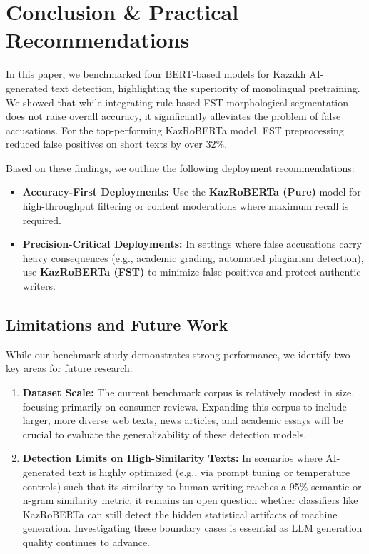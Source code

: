 \documentclass[runningheads]{llncs}
\begin{document}
\section{Conclusion \& Practical Recommendations}
In this paper, we benchmarked four BERT-based models for Kazakh AI-generated text detection, highlighting the superiority of monolingual pretraining. We showed that while integrating rule-based FST morphological segmentation does not raise overall accuracy, it significantly alleviates the problem of false accusations. For the top-performing KazRoBERTa model, FST preprocessing reduced false positives on short texts by over 32\%.

Based on these findings, we outline the following deployment recommendations:
\begin{itemize}
\item \textbf{Accuracy-First Deployments:} Use the \textbf{KazRoBERTa (Pure)} model for high-throughput filtering or content moderations where maximum recall is required.
\item \textbf{Precision-Critical Deployments:} In settings where false accusations carry heavy consequences (e.g., academic grading, automated plagiarism detection), use \textbf{KazRoBERTa (FST)} to minimize false positives and protect authentic writers.
\end{itemize}

\subsection{Limitations and Future Work}
While our benchmark study demonstrates strong performance, we identify two key areas for future research:
\begin{enumerate}
\item \textbf{Dataset Scale:} The current benchmark corpus is relatively modest in size, focusing primarily on consumer reviews. Expanding this corpus to include larger, more diverse web texts, news articles, and academic essays will be crucial to evaluate the generalizability of these detection models.
\item \textbf{Detection Limits on High-Similarity Texts:} In scenarios where AI-generated text is highly optimized (e.g., via prompt tuning or temperature controls) such that its similarity to human writing reaches a 95\% semantic or n-gram similarity metric, it remains an open question whether classifiers like KazRoBERTa can still detect the hidden statistical artifacts of machine generation. Investigating these boundary cases is essential as LLM generation quality continues to advance.
\end{enumerate}
\end{document}

